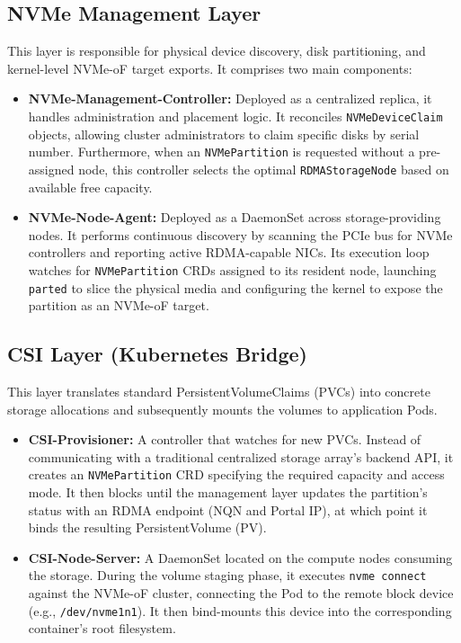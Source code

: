 \documentclass[sigconf]{acmart}
\begin{document}
\subsection{NVMe Management Layer}
This layer is responsible for physical device discovery, disk partitioning, and kernel-level NVMe-oF target exports. It comprises two main components:
\begin{itemize}
    \item \textbf{NVMe-Management-Controller:} Deployed as a centralized replica, it handles administration and placement logic. It reconciles \texttt{NVMeDeviceClaim} objects, allowing cluster administrators to claim specific disks by serial number. Furthermore, when an \texttt{NVMePartition} is requested without a pre-assigned node, this controller selects the optimal \texttt{RDMAStorageNode} based on available free capacity.
    \item \textbf{NVMe-Node-Agent:} Deployed as a DaemonSet across storage-providing nodes. It performs continuous discovery by scanning the PCIe bus for NVMe controllers and reporting active RDMA-capable NICs. Its execution loop watches for \texttt{NVMePartition} CRDs assigned to its resident node, launching \texttt{parted} to slice the physical media and configuring the kernel to expose the partition as an NVMe-oF target.
\end{itemize}

\subsection{CSI Layer (Kubernetes Bridge)}
This layer translates standard PersistentVolumeClaims (PVCs) into concrete storage allocations and subsequently mounts the volumes to application Pods.
\begin{itemize}
    \item \textbf{CSI-Provisioner:} A controller that watches for new PVCs. Instead of communicating with a traditional centralized storage array's backend API, it creates an \texttt{NVMePartition} CRD specifying the required capacity and access mode. It then blocks until the management layer updates the partition's status with an RDMA endpoint (NQN and Portal IP), at which point it binds the resulting PersistentVolume (PV).
    \item \textbf{CSI-Node-Server:} A DaemonSet located on the compute nodes consuming the storage. During the volume staging phase, it executes \texttt{nvme connect} against the NVMe-oF cluster, connecting the Pod to the remote block device (e.g., \texttt{/dev/nvme1n1}). It then bind-mounts this device into the corresponding container's root filesystem.
\end{itemize}
\end{document}
